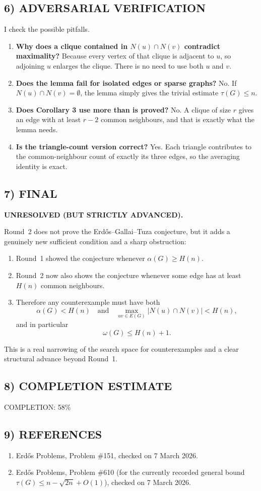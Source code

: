 \subsection*{6) ADVERSARIAL VERIFICATION}
I check the possible pitfalls.

\begin{enumerate}
\item \textbf{Why does a clique contained in $N(u)\cap N(v)$ contradict maximality?} Because every vertex of that clique is adjacent to $u$, so adjoining $u$ enlarges the clique. There is no need to use both $u$ and $v$.
\item \textbf{Does the lemma fail for isolated edges or sparse graphs?} No. If $N(u)\cap N(v)=\emptyset$, the lemma simply gives the trivial estimate $\tau(G)\le n$.
\item \textbf{Does Corollary 3 use more than is proved?} No. A clique of size $r$ gives an edge with at least $r-2$ common neighbours, and that is exactly what the lemma needs.
\item \textbf{Is the triangle-count version correct?} Yes. Each triangle contributes to the common-neighbour count of exactly its three edges, so the averaging identity is exact.
\end{enumerate}

\subsection*{7) FINAL}
\textbf{UNRESOLVED (BUT STRICTLY ADVANCED).}

Round~2 does not prove the Erd\H{o}s--Gallai--Tuza conjecture, but it adds a genuinely new sufficient condition and a sharp obstruction:

\begin{enumerate}
\item Round~1 showed the conjecture whenever $\alpha(G)\ge H(n)$.
\item Round~2 now also shows the conjecture whenever some edge has at least $H(n)$ common neighbours.
\item Therefore any counterexample must have both
\[
\alpha(G)<H(n)
\quad\mbox{and}\quad
\max_{uv\in E(G)}|N(u)\cap N(v)|<H(n),
\]
and in particular
\[
\omega(G)\le H(n)+1.
\]
\end{enumerate}

This is a real narrowing of the search space for counterexamples and a clear structural advance beyond Round~1.

\subsection*{8) COMPLETION ESTIMATE}
COMPLETION: 58\%

\subsection*{9) REFERENCES}
\begin{enumerate}
\item Erd\H{o}s Problems, Problem \#151, checked on 7 March 2026.
\item Erd\H{o}s Problems, Problem \#610 (for the currently recorded general bound $\tau(G)\le n-\sqrt{2n}+O(1)$), checked on 7 March 2026.
\end{enumerate}

